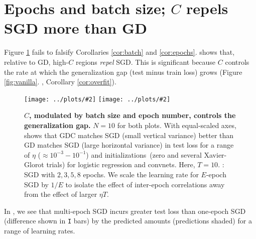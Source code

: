 \documentclass[openany, notitlepage, justified]{tufte-book}
\newcommand{\oftwo}[1]{%
    {\tiny\raisebox{0.04cm}{$%
        \ifthenelse{\equal{#1}{0}}{{\color{moor}\blacksquare}}{\square}%
        \ifthenelse{\equal{#1}{1}}{{\color{moor}\blacksquare}}{\square}%
    $}}%
}
\theoremstyle{plain}
\theoremstyle{definition}
\newcommand{\pmoo}[2]{\texttt{[image: ../plots/\#2]}}
\begin{document}
    \section{Epochs and batch size; $C$ repels SGD more than GD}
        Figure \ref{fig:be} fails to falsify Corollaries
        \ref{cor:batch} and
        \ref{cor:epochs}.
        \protect\oftwo{0} shows that, relative to GD, high-$C$ regions
        \emph{repel} SGD.  This is significant because $C$ controls the rate at
        which the generalization gap (test minus train loss) grows (Figure
        \ref{fig:vanilla}.\oftwo{1}, Corollary \ref{cor:overfit}).
        \begin{figure} 
            \centering
            \pmoo{3.75cm}{new-big-bm-new}          
            \pmoo{3.5cm}{multi-fashion-logistic-0}
            \caption{
                \textbf{$C$, modulated by batch size and epoch number,
                controls the generalization gap.}
                $N=10$ for both plots. 
                With equal-scaled axes, \protect\oftwo{0} shows that
                GDC matches SGD (small vertical variance) better than GD
                matches SGD (large horizontal variance) in test loss for a
                range of $\eta$ ($\approx 10^{-3}-10^{-1}$) and
                initializations\ (zero and several Xavier-Glorot trials) for
                logistic regression and convnets.  Here, $T=10$. 
                \protect\oftwo{1}:
                SGD with $2, 3, 5, 8$ epochs.  We scale the learning rate for
                $E$-epoch SGD by $1/E$ to isolate the effect of inter-epoch
                correlations away from the effect of larger $\eta T$.
            }
            \label{fig:be}
        \end{figure}
        In \protect\oftwo{1}, we see that multi-epoch SGD incurs
        greater test loss than one-epoch SGD (difference shown in \texttt{I}
        bars) by the predicted amounts (predictions shaded) for a range of
        learning rates.

\end{document}
